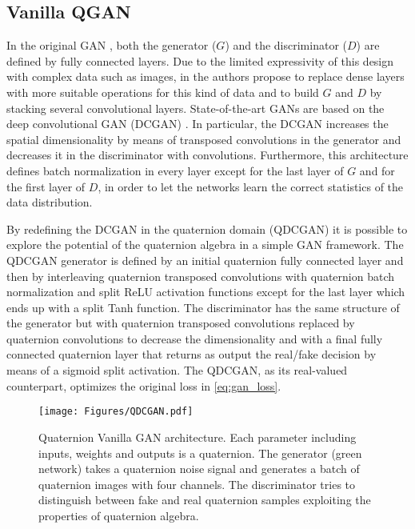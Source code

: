 \documentclass[graybox]{svmult}
\begin{document}
\subsection{Vanilla QGAN}
\label{sec:vanilla_qgan}
\noindent In the original GAN \cite{GoodfellowNIPS2014}, both the generator ($G$) and the discriminator ($D$) are defined by fully connected layers. Due to the limited expressivity of this design with complex data such as images, in \cite{Radford2016UnsupervisedRL} the authors propose to replace dense layers with more suitable operations for this kind of data and to build $G$ and $D$ by stacking several convolutional layers. State-of-the-art GANs are based on the deep convolutional GAN (DCGAN) \cite{Radford2016UnsupervisedRL}. In particular, the DCGAN increases the spatial dimensionality by means of transposed convolutions in the generator and decreases it in the discriminator with convolutions. Furthermore, this architecture defines batch normalization in every layer except for the last layer of $G$ and for the first layer of $D$, in order to let the networks learn the correct statistics of the data distribution. 

By redefining the DCGAN in the quaternion domain (QDCGAN) it is possible to explore the potential of the quaternion algebra in a simple GAN framework. The QDCGAN generator is defined by an initial quaternion fully connected layer and then by interleaving quaternion transposed convolutions with quaternion batch normalization and split ReLU activation functions except for the last layer which ends up with a split Tanh function. The discriminator has the same structure of the generator but with quaternion transposed convolutions replaced by quaternion convolutions to decrease the dimensionality and with a final fully connected quaternion layer that returns as output the real/fake decision by means of a sigmoid split activation. The QDCGAN, as its real-valued counterpart, optimizes the original loss in \eqref{eq:gan_loss}.


\begin{figure}
    \centering
    \texttt{[image: Figures/QDCGAN.pdf]}
    \caption{Quaternion Vanilla GAN architecture. Each parameter including inputs, weights and outputs is a quaternion. The generator (green network) takes a quaternion noise signal and generates a batch of quaternion images with four channels. The discriminator tries to distinguish between fake and real quaternion samples exploiting the properties of quaternion algebra.}
    \label{fig:qdcgan}
\end{figure}
\end{document}
